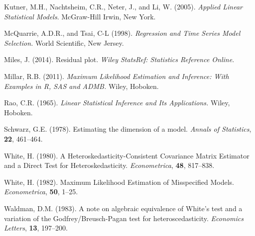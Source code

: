 \documentclass[review]{elsarticle}
\begin{document}
\begin{thebibliography}{99}
{\rm Kutner, M.H., Nachtsheim, C.R., Neter, J., and Li, W.} (2005).
 \emph{Applied Linear Statistical Models}.
\newblock McGraw-Hill Irwin, New York.

{\rm McQuarrie, A.D.R., and Tsai, C-L} (1998).
 \emph{Regression and Time Series Model Selection.}
\newblock World Scientific, New Jersey.

{\rm Miles, J.} (2014).
\newblock Residual plot.
\newblock \emph{Wiley StatsRef: Statistics Reference Online}.

{\rm Millar, R.B.} (2011).
\newblock \emph{Maximum Likelihood Estimation and Inference: With Examples in R, SAS and ADMB.}
\newblock Wiley, Hoboken.

{\rm Rao, C.R.} (1965).
\newblock \emph{Linear Statistical Inference and Its Applications.}
\newblock Wiley, Hoboken.

{\rm Schwarz, G.E.} (1978).
\newblock Estimating the dimension of a model.
\newblock \emph{Annals of Statistics}, {\bf 22},  461--464.

{\rm White, H.} (1980).
\newblock A Heteroskedasticity-Consistent Covariance Matrix Estimator and a Direct Test for Heteroskedasticity.
\newblock \emph{Econometrica}, {\bf 48},  817--838.

{\rm White, H.} (1982).
\newblock Maximum Likelihood Estimation of Misspecified Models.
\newblock \emph{Econometrica}, {\bf 50},  1--25.

{\rm Waldman, D.M.} (1983).
\newblock A note on algebraic equivalence of White's test and a variation of the Godfrey/Breusch-Pagan test for heteroscedasticity.
\newblock \emph{Economics Letters}, {\bf 13},  197--200.

\end{thebibliography}

\end{document}
